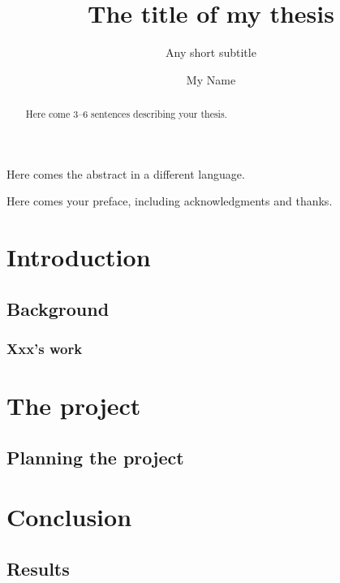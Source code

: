 \documentclass[UKenglish]{uiomasterthesis}  %
\title{The title of my thesis}        %
\subtitle{Any short subtitle}         %
\author{My Name}                      %
\begin{document}
	\uiomasterfp[dept={Department of Informatics},  %
	program={Informatics},                        %
	supervisors={Xing Cai\and James Trotter},     %
	long]                                     %
	
	\frontmatter{}
	\begin{abstract}
		Here come 3--6 sentences describing your thesis.
	\end{abstract}
	
	\begin{xabstract}[Sammendrag]               %
		Here comes the abstract in a different language.
	\end{xabstract}
	
	\tableofcontents{}                          %
	\listoffigures{}                            %
	\listoftables{}                             %
	
	\begin{preface}
		Here comes your preface, including acknowledgments and thanks.
	\end{preface}
	
	\mainmatter{}
	\part{Introduction}                   %
	\chapter{Background}                  %
	\section{Xxx's work}                  %
	
	\part{The project}                    %
	\chapter{Planning the project}        %
	
	\part{Conclusion}                     %
	\chapter{Results}                     %
	
	\backmatter{}
	\printbibliography{}
\end{document}
